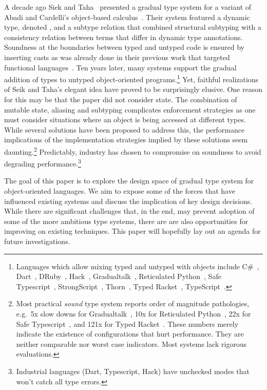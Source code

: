 \documentclass[a4paper,USenglish]{tex/lipics-v2016}
\begin{document}
\noindent
A decade ago Siek and Taha~\cite{SiekTaha07} presented a gradual type system
for a variant of Abadi and Cardelli's object-based
calculus~\cite{cardelli:1996:theory-of-objects}. Their system featured a
dynamic type, denoted \any, and a subtype relation that combined structural
subtyping with a consistency relation between terms that differ in dynamic
type annotations.  Soundness at the boundaries between typed and untyped
code is ensured by inserting casts as was already done in their previous
work that targeted functional languages~\cite{SiekTaha06}.  Ten years later,
many systems support the gradual addition of types to untyped
object-oriented programs.\footnote{Languages which allow mixing typed and
  untyped with objects include
C\#~\cite{Bierman10},
Dart~\cite{dart13}, 
DRuby~\cite{FurrAF2009},
Hack~\cite{hack13}, 
Gradualtalk~\cite{GS13},
Reticulated Python~\cite{siek14}, 
Safe Typescript~\cite{safe-typescript},
StrongScript~\cite{ecoop15}, 
Thorn~\cite{oopsla09}, 
Typed Racket~\cite{Takikawa:2012}, 
TypeScript~\cite{BAT14}.}
Yet, faithful realizations of Seik and Taha's elegant idea have proved to be
surprisingly elusive.  One reason for this may be that the paper did not
consider state.  The combination of mutable state, aliasing and subtyping
complicates enforcement strategies as one must consider situations where an
object is being accessed at different types. While several solutions have
been proposed to address this, the performance implications of the
implementation strategies implied by these solutions seem
daunting.\footnote{Most practical \emph{sound} type system reports order of
  magnitude pathologies, e.g.~5x slow downs for
  Gradualtalk~\cite{allende13}, 10x for Reticulated Python~\cite{siek14},
  22x for Safe Typescript~\cite{safe-typescript}, and 121x for Typed
  Racket~\cite{popl16}. These numbers merely indicate the existence of
  configurations that hurt performance.  They are neither comparable nor
  worst case indicators.  Most systems lack rigorous evaluations.  }
Predictably, industry has chosen to compromise on soundness to avoid
degrading performance.\footnote{Industrial languages (Dart, Typescript,
  Hack) have unchecked modes that won't catch all type errors.}

The goal of this paper is to explore the design space of gradual type system
for object-oriented languages. We aim to expose some of the forces that have
influenced existing systems and discuss the implication of key design
decisions. While there are significant challenges that, in the end, may
prevent adoption of some of the more ambitious type systems, there are are
also opportunities for improving on existing techniques.  This paper will
hopefully lay out an agenda for future investigations.
\end{document}
